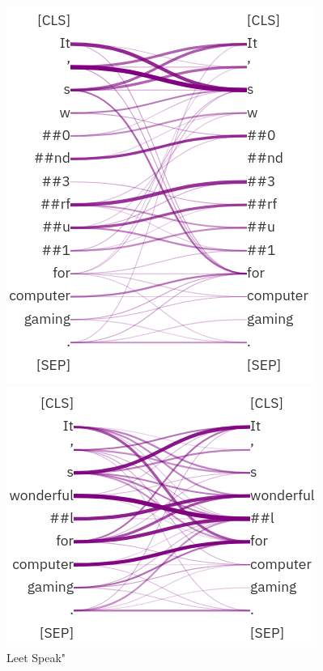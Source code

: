 \begin{figure}[H]
  \includegraphics[width=\linewidth]{img/attention_leet.png}
  \caption[BERT base attention heads - Leet Speak]{Leet Speak"}\label{fig:attention_leet}
\endminipage\hfill
{}
  \includegraphics[width=\linewidth]{img/attention_typo.png}

\end{figure}

